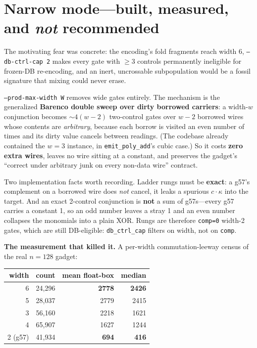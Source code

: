 \documentclass[11pt]{article}
\begin{document}
\section{Narrow mode---built, measured, and \emph{not} recommended}

The motivating fear was concrete: the encoding's fold fragments reach width 6,
\texttt{--db-ctrl-cap 2} makes every gate with $\ge3$ controls permanently
ineligible for frozen-DB re-encoding, and an inert, uncrossable subpopulation
would be a fossil signature that mixing could never erase.

\texttt{--prod-max-width W} removes wide gates entirely. The mechanism is the
generalized \textbf{Barenco double sweep over dirty borrowed carriers}: a
width-$w$ conjunction becomes ${\sim}4(w-2)$ two-control gates over $w-2$
borrowed wires whose contents are \emph{arbitrary}, because each borrow is
visited an even number of times and its dirty value cancels between readings.
(The codebase already contained the $w{=}3$ instance, in
\texttt{emit\_poly\_add}'s cubic case.) So it costs \textbf{zero extra wires},
leaves no wire sitting at a constant, and preserves the gadget's ``correct under
arbitrary junk on every non-data wire'' contract.

Two implementation facts worth recording. Ladder rungs must be \textbf{exact}: a
g57's complement on a borrowed wire does \emph{not} cancel, it leaks a spurious
$c\cdot\kappa$ into the target. And an exact 2-control conjunction is
\textbf{not} a sum of g57s---every g57 carries a constant 1, so an odd number
leaves a stray 1 and an even number collapses the monomials into a plain XOR.
Rungs are therefore \texttt{comp=0} width-2 gates, which are still
DB-eligible: \texttt{db\_ctrl\_cap} filters on width, not on \texttt{comp}.

\textbf{The measurement that killed it.} A per-width commutation-leeway census
of the real $n{=}128$ gadget:

\begin{center}
\begin{tabular}{rrrr}
\toprule
width & count & mean float-box & median \\
\midrule
6 & 24{,}296 & \textbf{2778} & \textbf{2426} \\
5 & 28{,}037 & 2779 & 2415 \\
3 & 56{,}160 & 2218 & 1621 \\
4 & 65{,}907 & 1627 & 1244 \\
2 (g57) & 41{,}934 & \textbf{694} & \textbf{416} \\
\bottomrule
\end{tabular}
\end{center}
\end{document}
